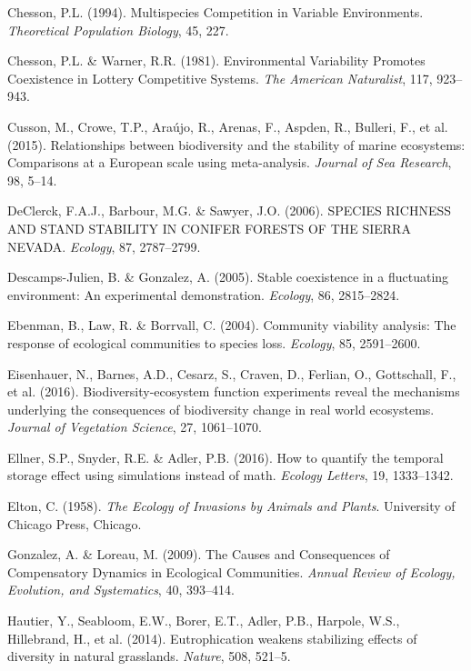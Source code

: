\documentclass[12pt,]{article}
\begin{document}
\hypertarget{ref-Chesson1994}{}
Chesson, P.L. (1994). Multispecies Competition in Variable Environments.
\emph{Theoretical Population Biology}, 45, 227.

\hypertarget{ref-Chesson1981a}{}
Chesson, P.L. \& Warner, R.R. (1981). Environmental Variability Promotes
Coexistence in Lottery Competitive Systems. \emph{The American
Naturalist}, 117, 923--943.

\hypertarget{ref-Cusson2015}{}
Cusson, M., Crowe, T.P., Araújo, R., Arenas, F., Aspden, R., Bulleri,
F., et al. (2015). Relationships between biodiversity and the stability
of marine ecosystems: Comparisons at a European scale using
meta-analysis. \emph{Journal of Sea Research}, 98, 5--14.

\hypertarget{ref-DeClerck2006}{}
DeClerck, F.A.J., Barbour, M.G. \& Sawyer, J.O. (2006). SPECIES RICHNESS
AND STAND STABILITY IN CONIFER FORESTS OF THE SIERRA NEVADA.
\emph{Ecology}, 87, 2787--2799.

\hypertarget{ref-Descamps-Julien2005}{}
Descamps-Julien, B. \& Gonzalez, A. (2005). Stable coexistence in a
fluctuating environment: An experimental demonstration. \emph{Ecology},
86, 2815--2824.

\hypertarget{ref-Ebenman2004}{}
Ebenman, B., Law, R. \& Borrvall, C. (2004). Community viability
analysis: The response of ecological communities to species loss.
\emph{Ecology}, 85, 2591--2600.

\hypertarget{ref-Eisenhauer2016}{}
Eisenhauer, N., Barnes, A.D., Cesarz, S., Craven, D., Ferlian, O.,
Gottschall, F., et al. (2016). Biodiversity-ecosystem function
experiments reveal the mechanisms underlying the consequences of
biodiversity change in real world ecosystems. \emph{Journal of
Vegetation Science}, 27, 1061--1070.

\hypertarget{ref-Ellner2016}{}
Ellner, S.P., Snyder, R.E. \& Adler, P.B. (2016). How to quantify the
temporal storage effect using simulations instead of math. \emph{Ecology
Letters}, 19, 1333--1342.

\hypertarget{ref-Elton1958}{}
Elton, C. (1958). \emph{The Ecology of Invasions by Animals and Plants}.
University of Chicago Press, Chicago.

\hypertarget{ref-Gonzalez2009}{}
Gonzalez, A. \& Loreau, M. (2009). The Causes and Consequences of
Compensatory Dynamics in Ecological Communities. \emph{Annual Review of
Ecology, Evolution, and Systematics}, 40, 393--414.

\hypertarget{ref-Hautier2014}{}
Hautier, Y., Seabloom, E.W., Borer, E.T., Adler, P.B., Harpole, W.S.,
Hillebrand, H., et al. (2014). Eutrophication weakens stabilizing
effects of diversity in natural grasslands. \emph{Nature}, 508, 521--5.
\end{document}

